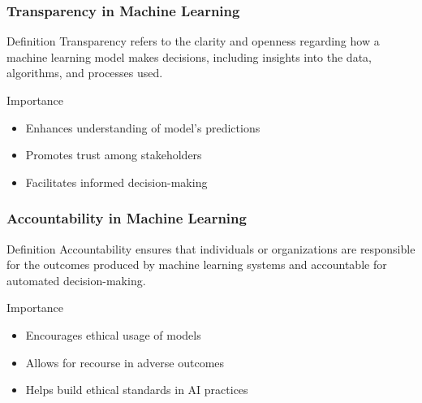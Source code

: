 \documentclass{beamer}
\begin{document}
\begin{frame}[fragile]
    \frametitle{Transparency in Machine Learning}
    \begin{block}{Definition}
        Transparency refers to the clarity and openness regarding how a machine learning model makes decisions, including insights into the data, algorithms, and processes used.
    \end{block}
    \begin{block}{Importance}
        \begin{itemize}
            \item Enhances understanding of model's predictions
            \item Promotes trust among stakeholders
            \item Facilitates informed decision-making
        \end{itemize}
    \end{block}
\end{frame}

\begin{frame}[fragile]
    \frametitle{Accountability in Machine Learning}
    \begin{block}{Definition}
        Accountability ensures that individuals or organizations are responsible for the outcomes produced by machine learning systems and accountable for automated decision-making.
    \end{block}
    \begin{block}{Importance}
        \begin{itemize}
            \item Encourages ethical usage of models
            \item Allows for recourse in adverse outcomes
            \item Helps build ethical standards in AI practices
        \end{itemize}
    \end{block}
\end{frame}
\end{document}
